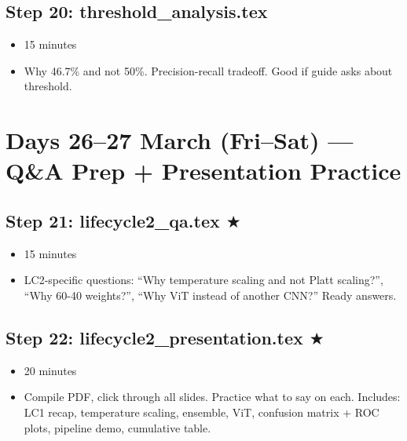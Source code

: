 \documentclass[12pt,a4paper]{article}
\begin{document}
\subsection*{Step 20: threshold\_analysis.tex}
\begin{itemize}[leftmargin=1.5cm]
    \item[\textbf{Time:}] 15 minutes
    \item[\textbf{What you learn:}] Why 46.7\% and not 50\%. Precision-recall tradeoff. Good if guide asks about threshold.
\end{itemize}

\section{Days 26--27 March (Fri--Sat) --- Q\&A Prep + Presentation Practice}

\begin{center}
\end{center}

\subsection*{Step 21: lifecycle2\_qa.tex $\bigstar$}
\begin{itemize}[leftmargin=1.5cm]
    \item[\textbf{Time:}] 15 minutes
    \item[\textbf{What you learn:}] LC2-specific questions: ``Why temperature scaling and not Platt scaling?'', ``Why 60-40 weights?'', ``Why ViT instead of another CNN?'' Ready answers.
\end{itemize}

\subsection*{Step 22: lifecycle2\_presentation.tex $\bigstar$}
\begin{itemize}[leftmargin=1.5cm]
    \item[\textbf{Time:}] 20 minutes
    \item[\textbf{Action:}] Compile PDF, click through all slides. Practice what to say on each. Includes: LC1 recap, temperature scaling, ensemble, ViT, confusion matrix + ROC plots, pipeline demo, cumulative table.
\end{itemize}
\end{document}
